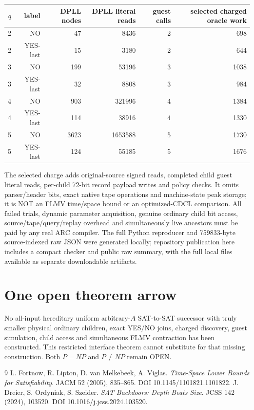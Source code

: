 \documentclass[11pt]{article}
\begin{document}
\begin{center}\begin{tabular}{rrrrrr}
\toprule
$q$ & label & DPLL nodes & DPLL literal reads & guest calls & selected charged oracle work\\
\midrule
2 & NO & 47 & 8436 & 2 & 698\\
2 & YES-last & 15 & 3180 & 2 & 644\\
3 & NO & 199 & 53196 & 3 & 1038\\
3 & YES-last & 32 & 8808 & 3 & 984\\
4 & NO & 903 & 321996 & 4 & 1384\\
4 & YES-last & 114 & 38916 & 4 & 1330\\
5 & NO & 3623 & 1653588 & 5 & 1730\\
5 & YES-last & 124 & 55185 & 5 & 1676\\
\bottomrule
\end{tabular}\end{center}
The selected charge adds original-source signed reads, completed child guest literal reads, per-child 72-bit record payload writes and policy checks. It omits parser/header bits, exact native tape operations and machine-state peak storage; it is NOT an FLMV time/space bound or an optimized-CDCL comparison. All failed trials, dynamic parameter acquisition, genuine ordinary child bit access, source/tape/query/replay overhead and simultaneously live ancestors must be paid by any real ARC compiler. The full Python reproducer and 759833-byte source-indexed raw JSON were generated locally; repository publication here includes a compact checker and public raw summary, with the full local files available as separate downloadable artifacts.

\section{One open theorem arrow}
No all-input hereditary uniform arbitrary-$A$ SAT-to-SAT successor with truly smaller physical ordinary children, exact YES/NO joins, charged discovery, guest simulation, child access and simultaneous FLMV contraction has been constructed. This restricted interface theorem cannot substitute for that missing construction. Both $P=NP$ and $P\ne NP$ remain OPEN.

\begin{thebibliography}{9}
 L. Fortnow, R. Lipton, D. van Melkebeek, A. Viglas. \emph{Time-Space Lower Bounds for Satisfiability}. JACM 52 (2005), 835--865. DOI 10.1145/1101821.1101822.
 J. Dreier, S. Ordyniak, S. Szeider. \emph{SAT Backdoors: Depth Beats Size}. JCSS 142 (2024), 103520. DOI 10.1016/j.jcss.2024.103520.
\end{thebibliography}
\end{document}
